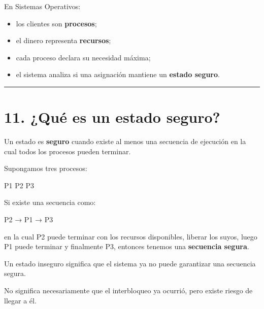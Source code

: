 \documentclass[
  spanish,
  letterpaper,
]{scrbook}
\newenvironment{Shaded}{\begin{snugshade}}{\end{snugshade}}
\newcommand{\NormalTok}[1]{\textcolor[rgb]{0.00,0.23,0.31}{#1}}
\providecommand{\tightlist}{%
  \setlength{\itemsep}{0pt}\setlength{\parskip}{0pt}}
\begin{document}
En Sistemas Operativos:

\begin{itemize}
\tightlist
\item
  los clientes son \textbf{procesos};
\item
  el dinero representa \textbf{recursos};
\item
  cada proceso declara su necesidad máxima;
\item
  el sistema analiza si una asignación mantiene un \textbf{estado
  seguro}.
\end{itemize}

\begin{center}\rule{0.5\linewidth}{0.5pt}\end{center}


\chapter{11. ¿Qué es un estado
seguro?}\label{quuxe9-es-un-estado-seguro}

Un estado es \textbf{seguro} cuando existe al menos una secuencia de
ejecución en la cual todos los procesos pueden terminar.

Supongamos tres procesos:

\begin{Shaded}
\begin{Highlighting}[]
\NormalTok{P1}
\NormalTok{P2}
\NormalTok{P3}
\end{Highlighting}
\end{Shaded}

Si existe una secuencia como:

\begin{Shaded}
\begin{Highlighting}[]
\NormalTok{P2 → P1 → P3}
\end{Highlighting}
\end{Shaded}

en la cual P2 puede terminar con los recursos disponibles, liberar los
suyos, luego P1 puede terminar y finalmente P3, entonces tenemos una
\textbf{secuencia segura}.

\begin{tcolorbox}[enhanced jigsaw, arc=.35mm, bottomrule=.15mm, bottomtitle=1mm, breakable, colback=white, colbacktitle=quarto-callout-important-color!10!white, colframe=quarto-callout-important-color-frame, coltitle=black, left=2mm, leftrule=.75mm, opacityback=0, opacitybacktitle=0.6, rightrule=.15mm, title=\textcolor{quarto-callout-important-color}{\faExclamation}\hspace{0.5em}{Estado inseguro ≠ interbloqueo actual}, titlerule=0mm, toprule=.15mm, toptitle=1mm]

Un estado inseguro significa que el sistema ya no puede garantizar una
secuencia segura.

No significa necesariamente que el interbloqueo ya ocurrió, pero existe
riesgo de llegar a él.

\end{tcolorbox}
\end{document}
